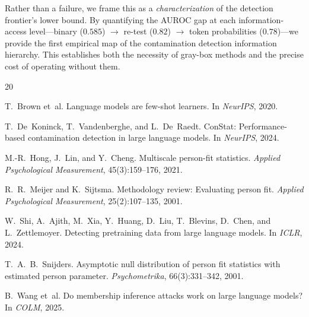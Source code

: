 \documentclass[11pt]{article}
\begin{document}
Rather than a failure, we frame this as a \emph{characterization} of the detection frontier's lower bound.
By quantifying the AUROC gap at each information-access level---binary ($0.585$) $\rightarrow$ re-test ($0.82$) $\rightarrow$ token probabilities ($0.78$)---we provide the first empirical map of the contamination detection information hierarchy.
This establishes both the necessity of gray-box methods and the precise cost of operating without them.




\begin{thebibliography}{20}

T.~Brown et~al.
\newblock Language models are few-shot learners.
\newblock In \emph{NeurIPS}, 2020.

T.~De~Koninck, T.~Vandenberghe, and L.~De~Raedt.
\newblock ConStat: Performance-based contamination detection in large language models.
\newblock In \emph{NeurIPS}, 2024.

M.-R.~Hong, J.~Lin, and Y.~Cheng.
\newblock Multiscale person-fit statistics.
\newblock \emph{Applied Psychological Measurement}, 45(3):159--176, 2021.

R.~R.~Meijer and K.~Sijtsma.
\newblock Methodology review: Evaluating person fit.
\newblock \emph{Applied Psychological Measurement}, 25(2):107--135, 2001.

W.~Shi, A.~Ajith, M.~Xia, Y.~Huang, D.~Liu, T.~Blevins, D.~Chen, and L.~Zettlemoyer.
\newblock Detecting pretraining data from large language models.
\newblock In \emph{ICLR}, 2024.

T.~A.~B.~Snijders.
\newblock Asymptotic null distribution of person fit statistics with estimated person parameter.
\newblock \emph{Psychometrika}, 66(3):331--342, 2001.

B.~Wang et~al.
\newblock Do membership inference attacks work on large language models?
\newblock In \emph{COLM}, 2025.

\end{thebibliography}
\end{document}
